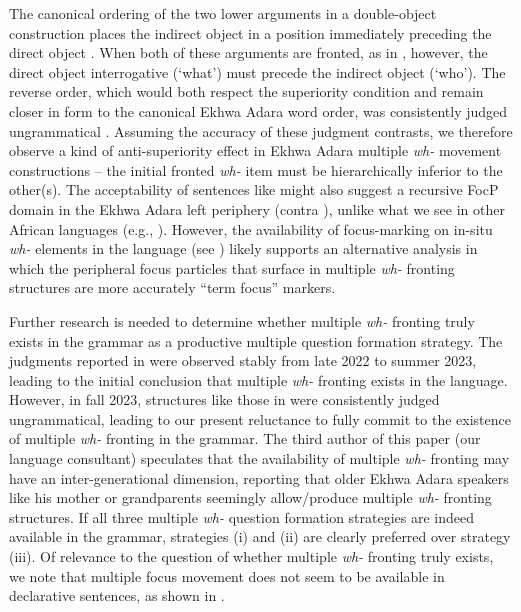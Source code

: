 \documentclass[output=paper,colorlinks,citecolor=brown
]{langscibook}
\begin{document}
\noindent The canonical ordering of the two lower arguments in a double-object construction places the indirect object in a position immediately preceding the direct object . When both of these arguments are fronted, as in , however, the direct object interrogative (`what') must precede the indirect object (`who'). The reverse order, which would both respect the superiority condition and remain closer in form to the canonical Ekhwa Adara word order, was consistently judged ungrammatical . Assuming the accuracy of these judgment contrasts, we therefore observe a kind of anti-superiority effect in Ekhwa Adara multiple \textit{wh-} movement constructions – the initial fronted \textit{wh-} item must be hierarchically inferior to the other(s). The acceptability of sentences like  might also suggest a recursive FocP domain in the Ekhwa Adara left periphery (contra \citet{Rizzi1997}), unlike what we see in other African languages (e.g., \citealt{aboh2004b}). However, the availability of focus-marking on in-situ \textit{wh-} elements in the language (see ) likely supports an alternative analysis in which the peripheral focus particles that surface in multiple \textit{wh-} fronting structures are more accurately “term focus” markers. 

Further research is needed to determine whether multiple \textit{wh-} fronting truly exists in the grammar as a productive multiple question formation strategy. The judgments reported in  were observed stably from late 2022 to summer 2023, leading to the initial conclusion that multiple \textit{wh-} fronting exists in the language. However, in fall 2023, structures like those in  were consistently judged ungrammatical, leading to our present reluctance to fully commit to the existence of multiple \textit{wh-} fronting in the grammar. The third author of this paper (our language consultant) speculates that the availability of multiple \textit{wh-} fronting may have an inter-generational dimension, reporting that older Ekhwa Adara speakers like his mother or grandparents seemingly allow/produce multiple \textit{wh-} fronting structures. If all three multiple \textit{wh-} question formation strategies are indeed available in the grammar, strategies (i) and (ii) are clearly preferred over strategy (iii). Of relevance to the question of whether multiple \textit{wh-} fronting truly exists, we note that multiple focus movement does not seem to be available in declarative sentences, as shown in .
\end{document}
